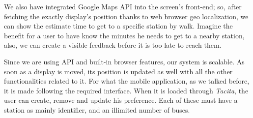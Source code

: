 \documentclass[]{usiinfbachelorproject}
\begin{document}
We also have integrated Google Maps API into the screen's front-end; so, after fetching the exactly display's position thanks to web browser geo localization, we can show the estimate time to get to a specific station by walk. Imagine the benefit for a user to have know the minutes he needs to get to a nearby station, also, we can create a visible feedback before it is too late to reach them.

Since we are using API and built-in browser features, our system is scalable. As soon as a display is moved, its position is updated as well with all the other functionalities related to it.
For what the mobile application, as we talked before, it is made following the required interface. When it is loaded through \emph{Tacita}, the user can create, remove and update his preference. Each of these must have a station as mainly identifier, and an illimited number of buses.
\end{document}
